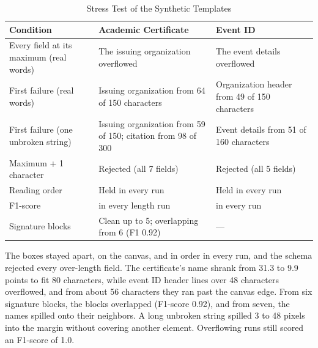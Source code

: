 \begin{refsection}
\begin{table}[!ht]
\centering
\caption{Stress Test of the Synthetic Templates}
\label{tab:stress}
\setlength{\tabcolsep}{4pt}
\begin{tabular}{>{\raggedright\arraybackslash}p{} >{\raggedright\arraybackslash}p{} >{\raggedright\arraybackslash}p{}}
\hline
\textbf{Condition} & \textbf{Academic Certificate} & \textbf{Event ID} \\ \hline
Every field at its maximum (real words) & The issuing organization overflowed & The event details overflowed \\
First failure (real words) & Issuing organization from 64 of 150 characters & Organization header from 49 of 150 characters \\
First failure (one unbroken string) & Issuing organization from 59 of 150; citation from 98 of 300 & Event details from 51 of 160 characters \\
Maximum + 1 character & Rejected (all 7 fields) & Rejected (all 5 fields) \\
Reading order & Held in every run & Held in every run \\
F1-score & 1.0 in every length run & 1.0 in every run \\
Signature blocks & Clean up to 5; overlapping from 6 (F1 0.92) & --- \\ \hline
\end{tabular}
\end{table}

The boxes stayed apart, on the canvas, and in order in every run, and the schema rejected every over-length field. The certificate's name shrank from 31.3 to 9.9 points to fit 80 characters, while event ID header lines over 48 characters overflowed, and from about 56 characters they ran past the canvas edge. From six signature blocks, the blocks overlapped (F1-score 0.92), and from seven, the names spilled onto their neighbors. A long unbroken string spilled 3 to 48 pixels into the margin without covering another element. Overflowing runs still scored an F1-score of 1.0.


\end{refsection}
